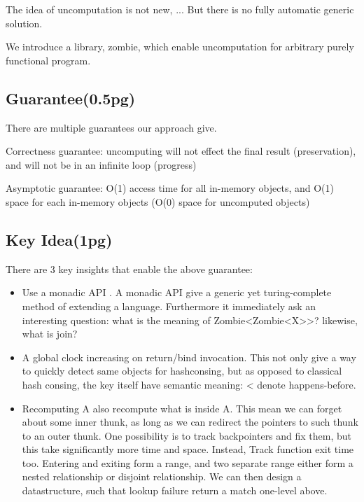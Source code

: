 The idea of uncomputation is not new, ... But there is no fully automatic generic solution.

We introduce a library, zombie, which enable uncomputation for arbitrary purely functional program.
\subsection{Guarantee(0.5pg)}
There are multiple guarantees our approach give.

Correctness guarantee: uncomputing will not effect the final result (preservation), and will not be in an infinite loop (progress)

Asymptotic guarantee: O(1) access time for all in-memory objects, and O(1) space for each in-memory objects (O(0) space for uncomputed objects)
\subsection{Key Idea(1pg)}
There are 3 key insights that enable the above guarantee:
\begin{itemize}
	\item Use a monadic API . A monadic API give a generic yet turing-complete  method of extending a language. Furthermore it immediately ask an interesting question: what is the meaning of Zombie<Zombie<X>>? likewise, what is join?
	\item A global clock increasing on return/bind invocation. This not only give a way to quickly detect same objects for hashconsing, but as opposed to classical hash consing, the key itself have semantic meaning: < denote happens-before.
	\item Recomputing A also recompute what is inside A. This mean we can forget about some inner thunk, as long as we can redirect the pointers to such thunk to an outer thunk. One possibility is to track backpointers and fix them, but this take significantly more time and space. Instead, Track function exit time too. Entering and exiting form a range, and two separate range either form a nested relationship or disjoint relationship. We can then design a datastructure, such that lookup failure return a match one-level above.
\end{itemize}
